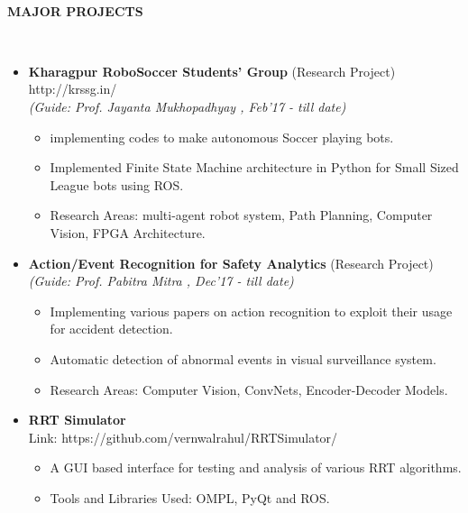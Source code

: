 \documentclass[a4paper,8pt]{article}
\newcommand{\isep}{-2 pt}
\newcommand{\lsep}{-0.5cm}
\newcommand{\resheading}[1]{{\small \colorbox{mygrey}{\begin{minipage}{0.975\textwidth}{\textbf{#1 \vphantom{p\^{E}}}}\end{minipage}}}}
\begin{document}
\hspace{0.5cm}\\[-0.2cm]
\resheading{\textbf{MAJOR PROJECTS} }\\[\lsep]

\begin{itemize}
\item \textbf{Kharagpur  RoboSoccer  Students'  Group} (Research Project) \hspace{0.5cm}
{http://krssg.in/}\\
 \emph{(Guide: Prof. Jayanta Mukhopadhyay
, Feb'17 - till date)} \\[-0.6cm]
	\begin{itemize}\itemsep \isep
	\item  implementing codes to make autonomous Soccer playing bots.
	\item Implemented Finite State Machine architecture in Python for Small Sized League bots using ROS.

	\item Research Areas: multi-agent robot system, Path Planning, Computer Vision, FPGA Architecture.
	\end{itemize}

\item \textbf{Action/Event Recognition for Safety Analytics} (Research Project) \hspace{0.5cm} \\
 \emph{(Guide: Prof. Pabitra Mitra
, Dec'17 - till date)} \\[-0.6cm]
	\begin{itemize}\itemsep \isep
	\item Implementing various papers on action recognition to exploit their usage for accident detection.
	\item Automatic detection of abnormal events in visual surveillance system.
	\item Research Areas: Computer Vision, ConvNets, Encoder-Decoder Models.
	\end{itemize}		 

\item \textbf{RRT Simulator} \\
Link: {https://github.com/vernwalrahul/RRTSimulator/}
\begin{itemize} \itemsep \isep
\item A GUI based interface for testing and analysis of various RRT algorithms.	
\item Tools and Libraries Used: OMPL, PyQt and ROS.
\end{itemize}


\end{itemize}
\end{document}
